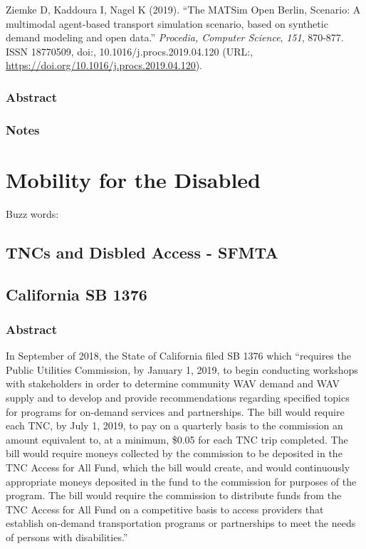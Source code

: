 \documentclass[]{article}
\begin{document}
Ziemke D, Kaddoura I, Nagel K (2019). ``The MATSim Open Berlin,
Scenario: A multimodal agent-based transport simulation scenario, based
on synthetic demand modeling and open data.'' \emph{Procedia, Computer
Science}, \emph{151}, 870-877. ISSN 18770509, doi:,
10.1016/j.procs.2019.04.120 (URL:,
\url{https://doi.org/10.1016/j.procs.2019.04.120}).

\hypertarget{abstract-25}{%
\subsubsection{Abstract}\label{abstract-25}}

\hypertarget{notes-25}{%
\subsubsection{Notes}\label{notes-25}}

\hypertarget{mobility-for-the-disabled}{%
\section{Mobility for the Disabled}\label{mobility-for-the-disabled}}

Buzz words:

\hypertarget{tncs-and-disbled-access---sfmta}{%
\subsection{TNCs and Disbled Access -
SFMTA}\label{tncs-and-disbled-access---sfmta}}

\hypertarget{california-sb-1376}{%
\subsection{California SB 1376}\label{california-sb-1376}}

\hypertarget{abstract-26}{%
\subsubsection{Abstract}\label{abstract-26}}

In September of 2018, the State of California filed SB 1376 which
``requires the Public Utilities Commission, by January 1, 2019, to begin
conducting workshops with stakeholders in order to determine community
WAV demand and WAV supply and to develop and provide recommendations
regarding specified topics for programs for on-demand services and
partnerships. The bill would require each TNC, by July 1, 2019, to pay
on a quarterly basis to the commission an amount equivalent to, at a
minimum, \$0.05 for each TNC trip completed. The bill would require
moneys collected by the commission to be deposited in the TNC Access for
All Fund, which the bill would create, and would continuously
appropriate moneys deposited in the fund to the commission for purposes
of the program. The bill would require the commission to distribute
funds from the TNC Access for All Fund on a competitive basis to access
providers that establish on-demand transportation programs or
partnerships to meet the needs of persons with disabilities.''
\end{document}
